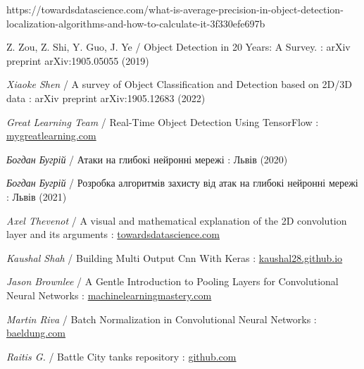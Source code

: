 \documentclass[14pt,a4paper]{extarticle}
\newcounter{e}
\numberwithin{equation}{section}
\numberwithin{figure}{section}
\begin{document}
\newpage
\thispagestyle{empty}
\begin{thebibliography}{99}

    https://towardsdatascience.com/what-is-average-precision-in-object-detection-localization-algorithms-and-how-to-calculate-it-3f330efe697b


    Z. Zou, Z. Shi, Y. Guo, J. Ye /
    Object Detection in 20 Years: A Survey. :
    arXiv preprint arXiv:1905.05055 (2019)

    \textit{Xiaoke Shen} /
    A survey of Object Classification and Detection based on 2D/3D data :
    arXiv preprint arXiv:1905.12683 (2022)

    \textit{Great Learning Team} /
    Real-Time Object Detection Using TensorFlow :
    \href{https://www.mygreatlearning.com/blog/object-detection-using-tensorflow/}{mygreatlearning.com}

    \textit{Богдан Бугрій} /
    Атаки на глибокі нейронні мережі :
    Львів (2020)

    \textit{Богдан Бугрій} /
    Розробка алгоритмів захисту від атак на глибокі нейронні мережі :
    Львів (2021)

    \textit{Axel Thevenot} /
    A visual and mathematical explanation of the 2D convolution layer and its arguments :
    \href{https://towardsdatascience.com/conv2d-to-finally-understand-what-happens-in-the-forward-pass-1bbaafb0b148}{towardsdatascience.com}

    \textit{Kaushal Shah} /
    Building Multi Output Cnn With Keras :
    \href{https://kaushal28.github.io/Building-Multi-Output-CNN-with-Keras}{kaushal28.github.io}

    \textit{Jason Brownlee} /
    A Gentle Introduction to Pooling Layers for Convolutional Neural Networks :
    \href{https://machinelearningmastery.com/pooling-layers-for-convolutional-neural-networks}{machinelearningmastery.com}
 

    \textit{Martin Riva} /
    Batch Normalization in Convolutional Neural Networks :
    \href{https://www.baeldung.com/cs/batch-normalization-cnn}{baeldung.com}

    \textit{Raitis G.} /
    Battle City tanks repository :
    \href{https://github.com/raitisg/battle-city-tanks}{github.com}


\end{thebibliography}
\end{document}
